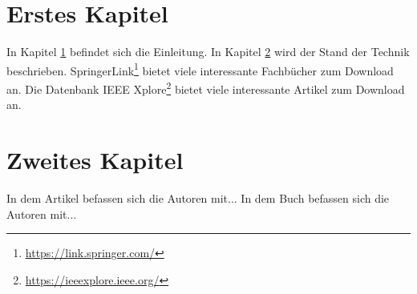 \documentclass[12pt,a4paper,final]{scrbook}
\begin{document}
\chapter{Erstes Kapitel}\label{chap:eins}
In Kapitel \ref{chap:eins} befindet sich die Einleitung. 
In Kapitel \ref{chap:zwei} wird der Stand der Technik beschrieben.  
SpringerLink\footnote{\url{https://link.springer.com/}} bietet viele interessante Fachbücher zum Download an. 
Die Datenbank IEEE Xplore\footnote{\url{https://ieeexplore.ieee.org/}} bietet viele interessante Artikel zum Download an. 

\chapter{Zweites Kapitel}\label{chap:zwei}
In dem Artikel \cite{linuxcncrte} befassen sich die Autoren mit...
In dem Buch \cite{computernetze} befassen sich die Autoren mit...

\printbibliography
\end{document}
